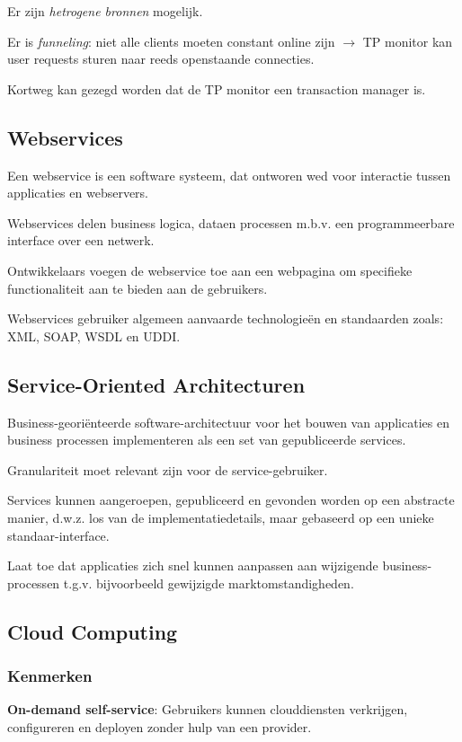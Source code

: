 \documentclass[a4paper,12pt]{article}
\begin{document}
Er zijn \textit{hetrogene bronnen} mogelijk.

Er is \textit{funneling}: niet alle clients moeten constant online zijn
$\rightarrow$ TP monitor kan user requests sturen naar reeds openstaande connecties.

Kortweg kan gezegd worden dat de TP monitor een transaction manager is.

\subsection{Webservices}
Een webservice is een software systeem, dat ontworen wed voor interactie tussen applicaties en webservers.

Webservices delen business logica, dataen processen m.b.v. een programmeerbare interface over een netwerk.

Ontwikkelaars voegen de webservice toe aan een webpagina om specifieke functionaliteit aan te bieden aan de gebruikers.

Webservices gebruiker algemeen aanvaarde technologieën en standaarden zoals: XML, SOAP, WSDL en UDDI.

\subsection{Service-Oriented Architecturen}
Business-georiënteerde software-architectuur voor het bouwen van applicaties en business processen implementeren als een set van gepubliceerde services.

Granulariteit moet relevant zijn voor de service-gebruiker.

Services kunnen aangeroepen, gepubliceerd en gevonden worden op een abstracte manier, d.w.z. los van de implementatiedetails, maar gebaseerd op een unieke standaar-interface.

Laat toe dat applicaties zich snel kunnen aanpassen aan wijzigende business-processen t.g.v. bijvoorbeeld gewijzigde marktomstandigheden.

\subsection{Cloud Computing}
\subsubsection{Kenmerken}
\textbf{On-demand self-service}: Gebruikers kunnen clouddiensten verkrijgen, configureren en deployen zonder hulp van een provider.
\end{document}
